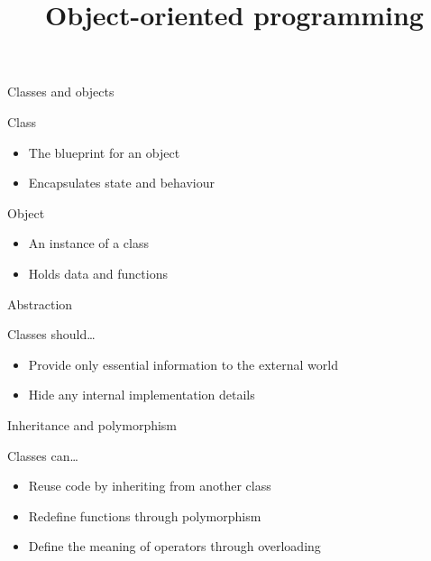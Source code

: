 

\title{Object-oriented programming}



\maketitle

\begin{frame}{Classes and objects}
    \begin{block}{Class}
        \begin{itemize}
            \item The blueprint for an object
            \item Encapsulates \alert{state} and \alert{behaviour}
        \end{itemize}
    \end{block}
    \begin{block}{Object}
        \begin{itemize}
            \item An instance of a class
            \item Holds data and functions
        \end{itemize}
    \end{block}
\end{frame}

\begin{frame}{Abstraction}
    \begin{block}{Classes should\ldots}
        \begin{itemize}
            \item Provide only essential information to the external world
            \item Hide any internal implementation details
        \end{itemize}
    \end{block}
\end{frame}

\begin{frame}{Inheritance and polymorphism}
    \begin{block}{Classes can\ldots}
        \begin{itemize}
            \item Reuse code by inheriting from another class
            \item Redefine functions through polymorphism
            \item Define the meaning of operators through overloading
        \end{itemize}
    \end{block}
\end{frame}

